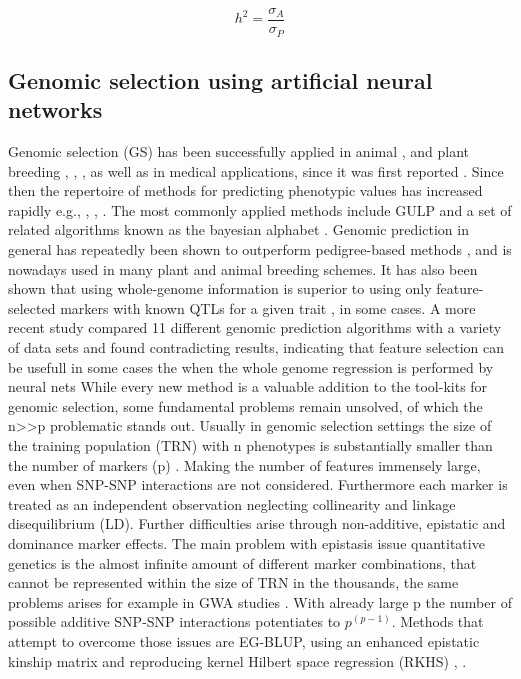 \begin{equation}
  h^2 = \frac{\sigma_{A}}{\sigma_{P}}
  \label{eqn:h2a}
\end{equation}







\subsection{Genomic selection using artificial neural networks }
Genomic selection (GS) has been successfully applied in animal \cite{gianola2015one}, \cite{hayes2010genome}
and plant breeding \cite{crossa2010}, \cite{desta2014genomic}, \cite{heffner2010plant}, \cite{crossa2017genomic}
as well as in medical applications, since it was first reported  \cite{hayes2001}. Since then the repertoire of
methods for predicting phenotypic values has increased rapidly e.g.\cite{dlc2009}, \cite{habier2011}, \cite{gianola2013} ,
\cite{crossa2017}. The most commonly applied methods include GULP and a set of related algorithms known as the bayesian alphabet
\cite{gianola2009}. 
Genomic prediction in general has repeatedly been shown to outperform pedigree-based methods \cite{crossa2010},
\cite{albrecht2011} and is nowadays used in many plant and animal breeding schemes. 
It has also been shown that using whole-genome information is superior to using only feature-selected markers
with known QTLs for a given trait \cite{bernardo2007}, \cite{heffner2011} in some cases. A more recent study
\cite{azodi2019} compared 11 different genomic prediction algorithms with a variety of data sets and found
contradicting results, indicating that feature selection can be usefull in some cases the when the whole
genome regression is performed by neural nets 
While every new method is a valuable addition to the tool-kits for genomic selection, some fundamental
problems remain unsolved, of which the n>>p problematic stands out. Usually in genomic selection settings
the size of the training population (TRN) with n phenotypes is substantially smaller than the number of
markers (p) \cite{fan2014challenges}. Making the number of features immensely large,  even when SNP-SNP
interactions are not considered.  Furthermore each marker is treated as an independent observation
neglecting collinearity and linkage disequilibrium (LD). 
Further difficulties arise through non-additive, epistatic and dominance marker effects. The main problem
with epistasis issue quantitative genetics is the almost infinite amount of different marker combinations,
that cannot be represented within the size of TRN in the thousands, the same problems arises for example
in GWA studies \cite{korte2013advantages}. With already large p the number of possible additive SNP-SNP interactions
potentiates to $p^{(p-1)}$. Methods that attempt to overcome those issues are EG-BLUP, using an enhanced
epistatic kinship matrix and reproducing kernel Hilbert space regression (RKHS) \cite{jiang2015}, \cite{martini2017genomic}.

